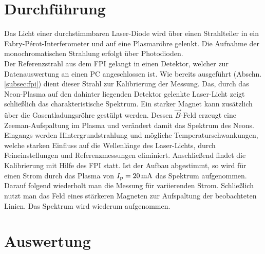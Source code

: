 \documentclass[numbers=noenddot,12pt,a4paper]{scrartcl}
\newcommand{\ix}[1]{_\text{#1}}
\begin{document}
\section{Durchführung}\label{subsec:durch}
Das Licht einer durchstimmbaren Laser-Diode wird über einen Strahlteiler in ein Fabry-Pérot-Interferometer und auf eine Plasmaröhre gelenkt. Die Aufnahme der monochromatischen Strahlung erfolgt über Photodioden.\\
Der Referenzstrahl aus dem FPI gelangt in einen Detektor, welcher zur Datenauswertung an einen PC angeschlossen ist. Wie bereits ausgeführt (Abschn. \ref{subsec:fpi}) dient dieser Strahl zur Kalibrierung der Messung. Das, durch das Neon-Plasma auf den dahinter liegenden Detektor gelenkte Laser-Licht zeigt schließlich das charakteristische Spektrum. Ein starker Magnet kann zusätzlich über die Gasentladungsröhre gestülpt werden. Dessen $\vec{B}$-Feld erzeugt eine Zeeman-Aufspaltung im Plasma und verändert damit das Spektrum des Neons.\\
Eingangs werden Hintergrundstrahlung und mögliche Temperaturschwankungen, welche starken Einfluss auf die Wellenlänge des Laser-Lichts, durch Feineinstellungen und Referenzmessungen eliminiert. Anschließend findet die Kalibrierung mit Hilfe des FPI statt. Ist der Aufbau abgestimmt, so wird für einen Strom durch das Plasma von $I\ix{p}=\unit[20]{mA}$ das Spektrum aufgenommen. Darauf folgend wiederholt man die Messung für variierenden Strom. Schließlich nutzt man das Feld eines stärkeren Magneten zur Aufspaltung der beobachteten Linien. Das Spektrum wird wiederum aufgenommen.
\newpage
\section{Auswertung}
\end{document}
